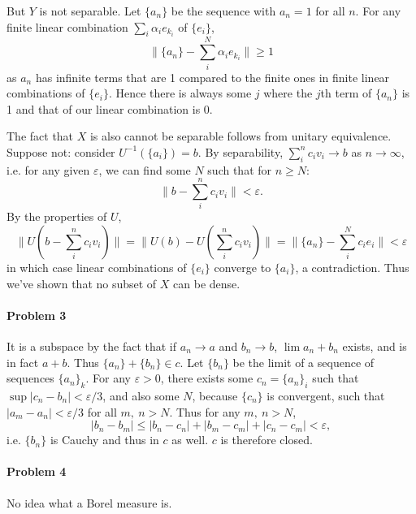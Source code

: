 \documentclass[12pt]{article}
\begin{document}
But $Y$ is not separable. Let $\{a_n\}$ be the sequence with $a_n = 1$ for
all $n$. For any finite linear combination $\sum_i\alpha_ie_{k_i}$ of $\{e_i\}$,
\begin{displaymath}
  \|\{a_n\} - \sum_i^N\alpha_ie_{k_i}\| \geq 1
\end{displaymath}
as $a_n$ has infinite terms that are 1 compared to the finite ones in finite
linear combinations of $\{e_i\}$. Hence there is always some $j$ where the
$j$th term of $\{a_n\}$ is 1 and that of our linear combination is 0.

The fact that $X$ is also cannot be separable follows from unitary equivalence.
Suppose not: consider $U^{-1}(\{a_i\}) = b$. By separability, $\sum_i^nc_iv_i
\to b$ as $n\to \infty$, i.e. for any given $\varepsilon$, we can find some
$N$ such that for $n\geq N$:
\begin{displaymath}
  \|b - \sum_i^nc_iv_i\| < \varepsilon.
\end{displaymath}
By the properties of $U$,
\begin{displaymath}
  \|U(b - \sum_i^nc_iv_i)\| = \|U(b)- U(\sum_i^nc_iv_i)\| =
  \|\{a_n\} - \sum_i^Nc_ie_i\| < \varepsilon
\end{displaymath}
in which case linear combinations of $\{e_i\}$ converge to $\{a_i\}$, a
contradiction. Thus we've shown that no subset of $X$ can be dense.



\paragraph{Problem 3}

It is a subspace by the fact that if $a_n \to a$ and $b_n \to b$, $\lim a_n + b_n
$ exists, and is in fact $a + b$. Thus $\{a_n\} + \{b_n\} \in c$. Let $\{b_n\}$
be the limit of a sequence of sequences $\{a_n\}_k$. For any $\varepsilon > 0$,
there exists some $c_n = \{a_n\}_i$ such that $\sup|c_n - b_n| < \varepsilon/3$,
and also some $N$, because $\{c_n\}$ is convergent, such that $|a_m - a_n| <
\varepsilon/3$ for all $m,\ n > N$. Thus for any $m,\ n > N$,
\begin{displaymath}
  |b_n - b_m| \leq |b_n-c_n| + |b_m-c_m| + |c_n-c_m| < \varepsilon,
\end{displaymath}
i.e. $\{b_n\}$ is Cauchy and thus in $c$ as well. $c$ is therefore closed.

\paragraph{Problem 4}
No idea what a Borel measure is.
\end{document}
